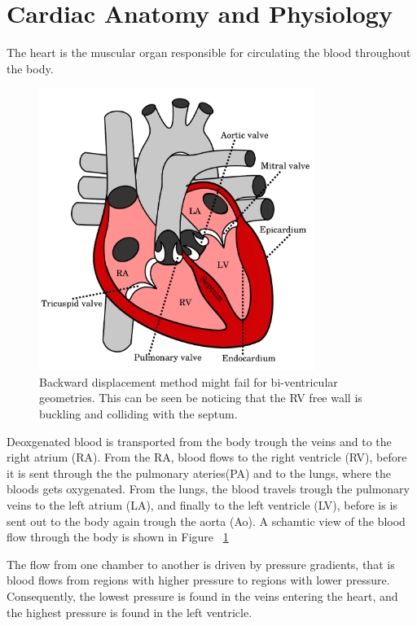 \section{Cardiac Anatomy and Physiology}

The heart is the muscular organ responsible for circulating the blood
throughout the body.


\begin{figure}[htbp]
  \centering
    \includegraphics[width=0.8\textwidth]{chapters/introduction/figures/heart_anatomy.pdf}
\caption{Backward displacement method might fail for bi-ventricular
  geometries. This can be seen be noticing that the RV free wall is
  buckling and colliding with the septum.}
\label{fig:heart_anatomy}
\end{figure}


Deoxgenated blood is transported from the body trough the veins and to
the right atrium (RA). From the RA, blood flows to the right ventricle
(RV), before it is sent through the the pulmonary ateries(PA) and to the
lungs, where the bloods gets oxygenated. From the lungs, the blood
travels trough the pulmonary veins to the left atrium (LA), and
finally to the left ventricle (LV), before is is sent out to the body
again trough the aorta (Ao). A schamtic view of the blood flow
through the body is shown in Figure ~\ref{fig:heart_anatomy}

The flow from one chamber to another is driven
by pressure gradients, that is blood flows from regions with higher
pressure to regions with lower pressure. Consequently, the lowest
pressure is found in the veins entering the heart, and the highest
pressure is found in the left ventricle. 

